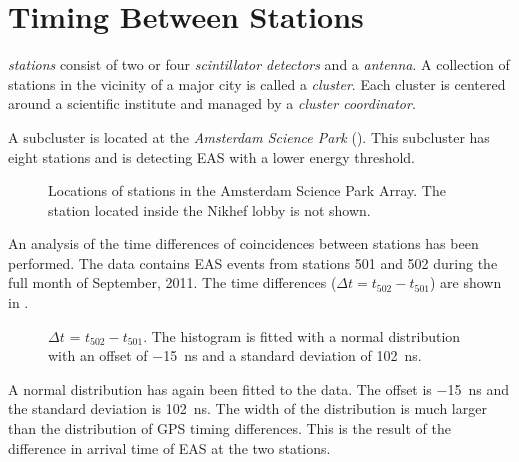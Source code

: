 \section{Timing Between Stations}
\label{sec:features-time-spectrum}

\hisparc \emph{stations} consist of two or
four \emph{scintillator detectors} and a \emph{ antenna}. A
collection of stations in the vicinity of a major city is called a
\emph{cluster}. Each cluster is centered around a scientific institute
and managed by a \emph{cluster coordinator}.

A subcluster is located at the \emph{Amsterdam Science Park}
().  This subcluster has eight
stations and is detecting EAS with a lower energy threshold.

\begin{figure}
\centering

\caption{Locations of \hisparc stations in the Amsterdam Science Park
Array.  The station located inside the Nikhef lobby is not shown.}
\label{fig:hisparc-locations-sciencepark}
\end{figure}

An analysis of the time differences of coincidences between stations has been
performed.  The data contains EAS events from stations 501 and 502 during the
full month of September, 2011.  The time differences ($\Delta t = t_{502} -
t_{501}$) are shown in .
\begin{figure}
\centering

\caption{
$\Delta t$ = $t_{502} - t_{501}$.  The histogram is fitted with a normal
distribution with an offset of
\SI{-15}{\nano\second} and a standard deviation of \SI{102}{\nano\second}.}
\label{fig:station-timing-distribution}
\end{figure}
A normal distribution has again been fitted to the data.  The offset is
\SI{-15}{\nano\second} and the standard deviation is \SI{102}{\nano\second}.
The width of the distribution is much larger than the distribution of GPS timing
differences.  This is the result of the difference in arrival time of EAS at the
two stations.

